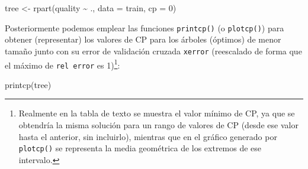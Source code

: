 \documentclass[
]{book}
\newenvironment{Shaded}{\begin{snugshade}}{\end{snugshade}}
\newcommand{\AttributeTok}[1]{\textcolor[rgb]{0.77,0.63,0.00}{#1}}
\newcommand{\DecValTok}[1]{\textcolor[rgb]{0.00,0.00,0.81}{#1}}
\newcommand{\FunctionTok}[1]{\textcolor[rgb]{0.00,0.00,0.00}{#1}}
\newcommand{\NormalTok}[1]{#1}
\newcommand{\OtherTok}[1]{\textcolor[rgb]{0.56,0.35,0.01}{#1}}
\newcommand{\SpecialCharTok}[1]{\textcolor[rgb]{0.00,0.00,0.00}{#1}}
\theoremstyle{break}
\theoremstyle{definition}
\theoremstyle{definition}
\theoremstyle{definition}
\theoremstyle{definition}
\theoremstyle{remark}
\begin{document}
\begin{Shaded}
\begin{Highlighting}[]
\NormalTok{tree }\OtherTok{\textless{}{-}} \FunctionTok{rpart}\NormalTok{(quality }\SpecialCharTok{\textasciitilde{}}\NormalTok{ ., }\AttributeTok{data =}\NormalTok{ train, }\AttributeTok{cp =} \DecValTok{0}\NormalTok{)}
\end{Highlighting}
\end{Shaded}

Posteriormente podemos emplear las funciones \texttt{printcp()} (o \texttt{plotcp()}) para obtener (representar)
los valores de CP para los árboles (óptimos) de menor tamaño junto con su error de validación cruzada
\texttt{xerror} (reescalado de forma que el máximo de \texttt{rel\ error} es 1)\footnote{Realmente en la tabla de texto se muestra el valor mínimo de CP, ya que se obtendría la misma solución para un rango de valores de CP (desde ese valor hasta el anterior, sin incluirlo), mientras que en el gráfico generado por \texttt{plotcp()} se representa la media geométrica de los extremos de ese intervalo.}:

\begin{Shaded}
\begin{Highlighting}[]
\FunctionTok{printcp}\NormalTok{(tree)}
\end{Highlighting}
\end{Shaded}
\end{document}
